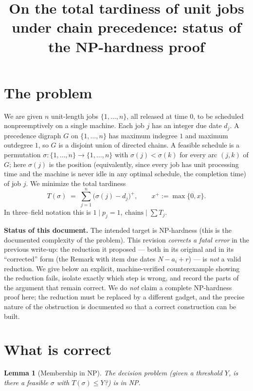 \documentclass{amsart}
\newtheorem{lemma}{Lemma}
\theoremstyle{definition}
\theoremstyle{remark}
\begin{document}
\title{On the total tardiness of unit jobs under chain precedence:
status of the NP-hardness proof}
\maketitle

\section{The problem}

We are given $n$ unit-length jobs $\{1,\dots,n\}$, all released at time $0$, to be
scheduled nonpreemptively on a single machine. Each job $j$ has an integer due date
$d_j$. A precedence digraph $G$ on $\{1,\dots,n\}$ has maximum indegree $1$ and maximum
outdegree $1$, so $G$ is a disjoint union of directed chains. A feasible schedule is a
permutation $\sigma:\{1,\dots,n\}\to\{1,\dots,n\}$ with $\sigma(j)<\sigma(k)$ for every
arc $(j,k)$ of $G$; here $\sigma(j)$ is the position (equivalently, since every job has
unit processing time and the machine is never idle in any optimal schedule, the
completion time) of job $j$. We minimize the total tardiness
\[
   T(\sigma)\;=\;\sum_{j=1}^{n}\bigl(\sigma(j)-d_j\bigr)^{+},
   \qquad x^{+}:=\max\{0,x\}.
\]
In three--field notation this is $1\mid p_j=1,\ \mathrm{chains}\mid \sum T_j$.

\medskip
\noindent\textbf{Status of this document.}
The intended target is NP-hardness (this is the documented complexity of the problem).
This revision \emph{corrects a fatal error} in the previous write-up: the reduction it
proposed --- both in its original and in its ``corrected'' form (the Remark with item due
dates $N-a_i+r$) --- is \emph{not} a valid reduction. We give below an explicit,
machine-verified counterexample showing the reduction fails, isolate exactly which step is
wrong, and record the parts of the argument that remain correct. We do \emph{not} claim a
complete NP-hardness proof here; the reduction must be replaced by a different gadget, and
the precise nature of the obstruction is documented so that a correct construction can be
built.

\section{What is correct}

\begin{lemma}[Membership in NP]\label{lem:np}
The decision problem (given a threshold $Y$, is there a feasible $\sigma$ with
$T(\sigma)\le Y$?) is in NP.
\end{lemma}
\end{document}

